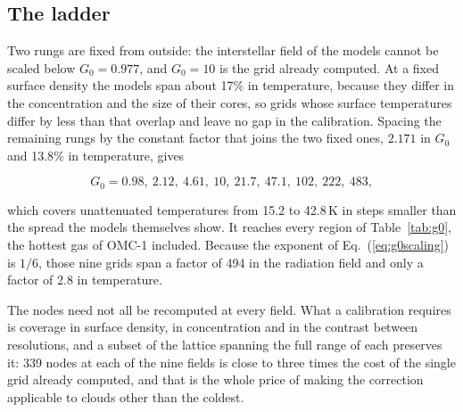 \subsection{The ladder}
\label{app:field:ladder}

Two rungs are fixed from outside: the interstellar field of the models cannot be scaled below $G_0 = 0.977$, and $G_0 = 10$ is the
grid already computed.  At a fixed surface density the models span about 17{\%} in temperature, because they differ in the
concentration and the size of their cores, so grids whose surface temperatures differ by less than that overlap and leave no gap
in the calibration.  Spacing the remaining rungs by the constant factor that joins the two fixed ones, $2.171$ in $G_0$ and
13.8{\%} in temperature, gives

\begin{equation}
   G_0 = 0.98,\ 2.12,\ 4.61,\ 10,\ 21.7,\ 47.1,\ 102,\ 222,\ 483 ,
\label{eq:g0ladder}
\end{equation}

which covers unattenuated temperatures from 15.2 to 42.8\,K in steps smaller than the spread the models themselves show.  It
reaches every region of Table~\ref{tab:g0}, the hottest gas of OMC-1 included.  Because the exponent of Eq.~(\ref{eq:g0scaling})
is $1/6$, those nine grids span a factor of 494 in the radiation field and only a factor of 2.8 in temperature.

The nodes need not all be recomputed at every field.  What a calibration requires is coverage in surface density, in
concentration and in the contrast between resolutions, and a subset of the lattice spanning the full range of each preserves it:
339 nodes at each of the nine fields is close to three times the cost of the single grid already computed, and that is the whole
price of making the correction applicable to clouds other than the coldest.
